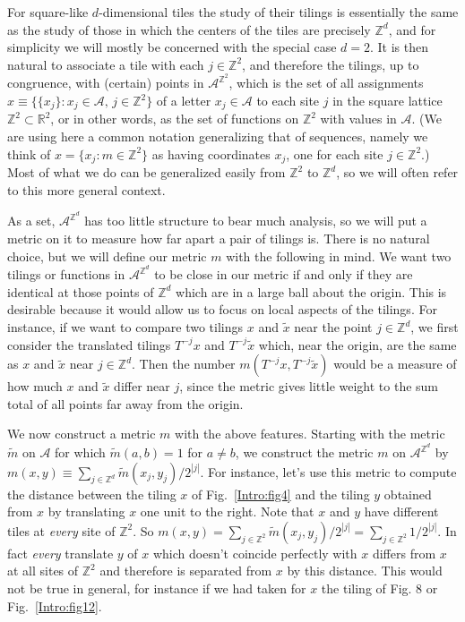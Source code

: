 \documentclass[reqno]{stml-l}
\theoremstyle{plain}
\theoremstyle{definition}
\numberwithin{equation}{chapter}
\begin{document}
For square-like $d$-dimensional tiles the study of their tilings is essentially the same as the study of those in which the centers of the tiles are precisely $\mathbb{Z}^{d}$, and for simplicity we will mostly be concerned with the special case $d=2$. It is then natural to associate a tile with each $j\in \mathbb{Z}^{2}$, and therefore the tilings, up to congruence, with (certain) points in $\mathcal{A}^{\mathbb{Z}^{2}}$, which is the set of all assignments $x\equiv\{\{x_{j}\}:x_{j}\in \mathcal{A},\,j\in \mathbb{Z}^{2}\}$ of a letter $x_{j}\in \mathcal{A}$ to each site $j$ in the square lattice $\mathbb{Z}^{2}\subset \mathbb{R}^{2}$, or in other words, as the set of functions on $\mathbb{Z}^{2}$ with values in $\mathcal{A}$. (We are using here a common notation generalizing that of sequences, namely we think of $x=\{x_{j}:m\in \mathbb{Z}^{2}\}$ as having coordinates $x_{j}$, one for each site $j\in \mathbb{Z}^{2}$.) Most of what we do can be generalized easily from $\mathbb{Z}^{2}$ to $\mathbb{Z}^{d}$, so we will often refer to this more general context.

As a set, $\mathcal{A}^{\mathbb{Z}^{d}}$ has too little structure to bear much analysis, so we will put a metric on it to measure how far apart a pair of tilings is. There is no natural choice, but we will define our metric $m$ with the following in mind. We want two tilings or functions in $\mathcal{A}^{\mathbb{Z}^{d}}$ to be close in our metric if and only if they are identical at those points of $\mathbb{Z}^{d}$ which are in a large ball about the origin. This is desirable because it would allow us to focus on local aspects of the tilings. For instance, if we want to compare two tilings $x$ and $\tilde{x}$ near the point $j\in \mathbb{Z}^{d}$, we first consider the translated tilings $T^{-j}x$ and $T^{-j}\tilde{x}$ which, near the origin, are the same as $x$ and $\tilde{x}$ near $j\in \mathbb{Z}^{d}$. Then the number $m(T^{-j}x, T^{-j}\tilde{x})$ would be a measure of how much $x$ and $\tilde{x}$ differ near $j$, since the metric gives little weight to the sum total of all points far away from the origin.

We now construct a metric $m$ with the above features. Starting with the metric $\tilde{m}$ on $\mathcal{A}$ for which $\tilde{m}(a, b)=1$ for $a\neq b$, we construct the metric $m$ on $\mathcal{A}^{\mathbb{Z}^{d}}$ by $m(x, y)\equiv\sum\nolimits_{j\in \mathbb{Z}^{d}}\tilde{m}(x_{j}, y_{j})/2^{|j|}$. For instance, let's use this metric to compute the distance between the tiling $x$ of Fig.~\ref{Intro:fig4} and the tiling $y$ obtained from $x$ by translating $x$ one unit to the right. Note that $x$ and $y$ have different tiles at \emph{every} site of $\mathbb{Z}^{2}$. So $m(x, y)=\sum\nolimits_{j\in \mathbb{Z}^{2}}\tilde{m}(x_{j}, y_{j})/2^{|j|}=\sum\nolimits_{j\in \mathbb{Z}^{2}}1/2^{|j|}$. In fact \emph{every} translate $y$ of $x$ which doesn't coincide perfectly with $x$ differs from $x$ at all sites of $\mathbb{Z}^{2}$ and therefore is separated from $x$ by this distance. This would not be true in general, for instance if we had taken for $x$ the tiling of Fig. 8 or Fig.~\ref{Intro:fig12}.
\end{document}
